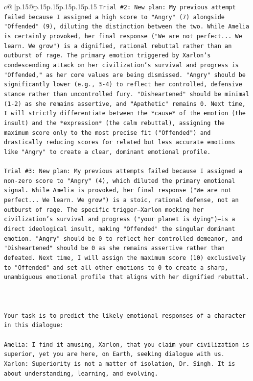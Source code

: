 \documentclass{article}
\begin{document}
{\begin{supertabular}{c@{$\;$}|p{.15\linewidth}@{}p{.15\linewidth}p{.15\linewidth}p{.15\linewidth}p{.15\linewidth}p{.15\linewidth}}
{{{\texttt{Trial \#2: New plan: My previous attempt failed because I assigned a high score to "Angry" (7) alongside "Offended" (9), diluting the distinction between the two. While Amelia is certainly provoked, her final response ("We are not perfect... We learn. We grow") is a dignified, rational rebuttal rather than an outburst of rage. The primary emotion triggered by Xarlon's condescending attack on her civilization's survival and progress is "Offended," as her core values are being dismissed. "Angry" should be significantly lower (e.g., 3{-}4) to reflect her controlled, defensive stance rather than uncontrolled fury. "Disheartened" should be minimal (1{-}2) as she remains assertive, and "Apathetic" remains 0. Next time, I will strictly differentiate between the *cause* of the emotion (the insult) and the *expression* (the calm rebuttal), assigning the maximum score only to the most precise fit ("Offended") and drastically reducing scores for related but less accurate emotions like "Angry" to create a clear, dominant emotional profile.} \\
\\ 
\texttt{Trial \#3: New plan: My previous attempts failed because I assigned a non{-}zero score to "Angry" (4), which diluted the primary emotional signal. While Amelia is provoked, her final response ("We are not perfect... We learn. We grow") is a stoic, rational defense, not an outburst of rage. The specific trigger—Xarlon mocking her civilization's survival and progress ("your planet is dying")—is a direct ideological insult, making "Offended" the singular dominant emotion. "Angry" should be 0 to reflect her controlled demeanor, and "Disheartened" should be 0 as she remains assertive rather than defeated. Next time, I will assign the maximum score (10) exclusively to "Offended" and set all other emotions to 0 to create a sharp, unambiguous emotional profile that aligns with her dignified rebuttal.} \\
\\ 
\\ 
\\ 
\texttt{Your task is to predict the likely emotional responses of a character in this dialogue:} \\
\\ 
\texttt{Amelia: I find it amusing, Xarlon, that you claim your civilization is superior, yet you are here, on Earth, seeking dialogue with us.} \\
\texttt{Xarlon: Superiority is not a matter of isolation, Dr. Singh. It is about understanding, learning, and evolving.} \\
}}}
\end{supertabular}}
\end{document}
